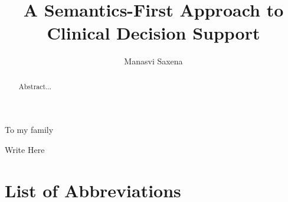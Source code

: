 \documentclass{uiucthesis2021}
\begin{document}
\title{A Semantics-First Approach to Clinical Decision Support}
\author{Manasvi Saxena}
\phdthesis
{}
\maketitle

\frontmatter

\begin{abstract}
  Abstract...
\end{abstract}

\begin{dedication}
To my family
\end{dedication}

\begin{acknowledgments}
  Write Here
\end{acknowledgments}

{
    \hypersetup{linkcolor=black}  %
    \tableofcontents
}

\chapter{List of Abbreviations}
\end{document}
